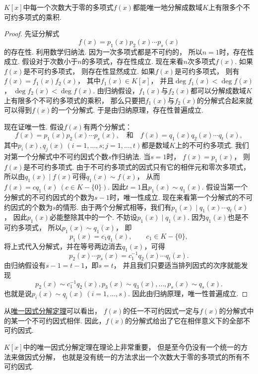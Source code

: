 \begin{theorem}[唯一因式分解定理]\label{theorem:多项式.唯一因式分解定理}
\(K[x]\)中每一个次数大于零的多项式\(f(x)\)都能唯一地分解成数域\(K\)上有限多个不可约多项式的乘积.
\begin{proof}
先证分解式\[
	f(x) = p_1(x) p_2(x) \dotsm p_s(x)
\]的存在性.
利用数学归纳法.
因为一次多项式都是不可约的，
所以\(n=1\)时，存在性成立.
假设对于次数小于\(n\)的多项式，存在性成立.
现在来看\(n\)次多项式\(f(x)\).
如果\(f(x)\)是不可约多项式，
则存在性显然成立.
如果\(f(x)\)是可约多项式，
则有\(f(x)=f_1(x) f_2(x)\)，
其中\(f_1(x) \in K[x]\)，
并且\(\deg f_1(x) < \deg f(x)\)，
\(\deg f_2(x) < \deg f(x)\).
由归纳假设，\(f_1(x)\)与\(f_2(x)\)都可以分解成数域\(K\)上有限多个不可约多项式的乘积，
那么只要把\(f_1(x)\)与\(f_2(x)\)的分解式合起来就可以得到\(f(x)\)的一个分解式.
于是由归纳原理，存在性普遍成立.

现在证唯一性.
假设\(f(x)\)有两个分解式：\[
	f(x) = p_1(x) p_2(x) \dotsm p_s(x),
	\quad\text{和}\quad
	f(x) = q_1(x) q_2(x) \dotsm q_t(x),
\]
其中\(p_i(x),q_j(x)\ (i=1,\dotsc,s;j=1,\dotsc,t)\)都是数域\(K\)上的不可约多项式.
我们对第一个分解式中不可约因式个数\(s\)作归纳法.
当\(s=1\)时，
\(f(x) = p_1(x)\)，
则\(f(x)\)是不可约多项式.
由于不可约多项式的因式只有它的相伴元和零次多项式，
所以由\(q_1(x) \mid f(x)\)可得\(q_1(x) \sim f(x)\)，
从而\(f(x) = c q_1(x)\ (c \in K-\{0\})\).
因此\(t=1\)且\(p_1(x) \sim q_1(x)\).
假设当第一个分解式的不可约因式的个数为\(s-1\)时，唯一性成立.
现在来看第一个分解式的不可约因式的个数为\(s\)的情形.
由于两个分解式相等，我们有\(p_1(x) \mid q_1(x) \dotsm q_t(x)\)，
因此\(p_1(x)\)必能整除其中的一个.
不妨设\(p_1(x) \mid q_1(x)\).
因为\(q_1(x)\)也是不可约多项式，
所以\(p_1(x) \sim q_1(x)\)，
即\[
	p_1(x) = c_1 q_1(x), \qquad
	c_1 \in K-\{0\},
\]
将上式代入分解式，并在等号两边消去\(q_1(x)\)，可得\[
	p_2(x) \dotsm p_s(x) = c_1^{-1} q_2(x) \dotsm q_t(x).
\]
由归纳假设有\(s-1=t-1\)，即\(s=t\)，
并且我们只要适当排列因式的次序就能发现\[
	p_2(x) \sim c_1^{-1} q_2(x),
	p_3(x) \sim q_3(x),
	\dotsc,
	p_s(x) \sim q_s(x).
\]
也就是说\(p_i(x) \sim q_i(x)\ (i=1,\dotsc,s)\).
因此由归纳原理，唯一性普遍成立.
\end{proof}
\end{theorem}

从\hyperref[theorem:多项式.唯一因式分解定理]{唯一因式分解定理}可以看出，
\(f(x)\)的任一不可约因式一定与\(f(x)\)的分解式中的某一个不可约因式相伴.
因此，\(f(x)\)的分解式给出了它在相伴意义下的全部不可约因式.

\(K[x]\)中的唯一因式分解定理在理论上非常重要，
但是至今仍没有一个统一的方法来做因式分解，
也就是没有统一的方法求出一个次数大于零的多项式的所有不可约因式.

